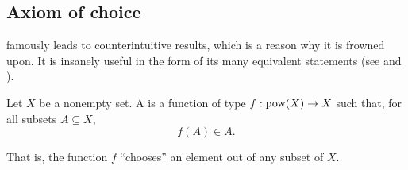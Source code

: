 \subsection{Axiom of choice}\label{subsec:axiom_of_choice}

\begin{remark}\label{rem:aoc}
   famously leads to counterintuitive results, which is a reason why it is frowned upon. It is insanely useful in the form of its many equivalent statements (see  and ).
\end{remark}

\begin{definition}\label{def:choice_function}
  Let \( X \) be a nonempty set. A  is a function of type \( f: \operatorname{pow}(X) \to X \) such that, for all subsets \( A \subseteq X \),
  \begin{equation*}
    f(A) \in A.
  \end{equation*}

  That is, the function \( f \) \enquote{chooses} an element out of any subset of \( X \).
\end{definition}

